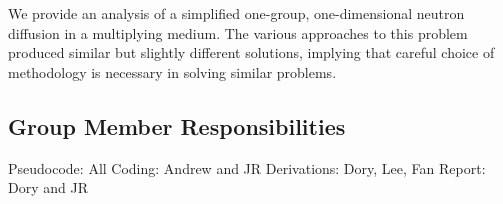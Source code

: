 \documentclass[../main.tex]{subfiles}
\begin{document}
	We provide an analysis of a simplified one-group, one-dimensional neutron diffusion in a multiplying medium. The various approaches to this problem produced similar but slightly different solutions, implying that careful choice of methodology is necessary in solving similar problems. 

\subsection{Group Member Responsibilities}
Pseudocode: All
Coding: Andrew and JR
Derivations: Dory, Lee, Fan
Report: Dory and JR
\end{document}
